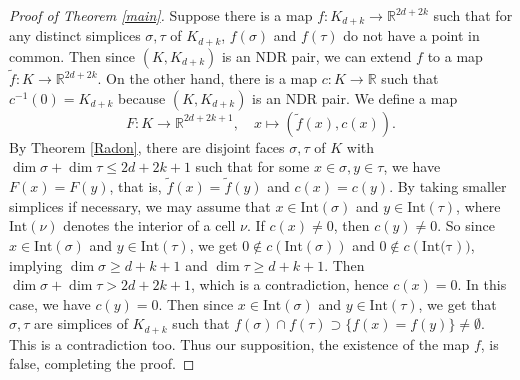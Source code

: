 \documentclass[amsfonts]{amsart}
\numberwithin{equation}{section}
\theoremstyle{definition}
\theoremstyle{remark}
\newcommand{\R}{\mathbb{R}}
\begin{document}
  \begin{proof}
    [Proof of Theorem \ref{main}]
    Suppose there is a map $f\colon K_{d+k}\to\R^{2d+2k}$ such that for any distinct simplices $\sigma,\tau$ of $K_{d+k}$, $f(\sigma)$ and $f(\tau)$ do not have a point in common. Then since $(K,K_{d+k})$ is an NDR pair, we can extend $f$ to a map $\tilde{f}\colon K\to\R^{2d+{2k}}$. On the other hand, there is a map $c\colon K\to\R$ such that $c^{-1}(0)=K_{d+k}$ because $(K,K_{d+k})$ is an NDR pair. We define a map
    \[
      F\colon K\to\R^{2d+2k+1},\quad x\mapsto(\tilde{f}(x),c(x)).
    \]
    By Theorem \ref{Radon}, there are disjoint faces $\sigma,\tau$ of $K$ with $\dim\sigma+\dim\tau\le 2d+2k+1$ such that for some $x\in\sigma,y\in\tau$, we have $F(x)=F(y)$, that is, $\tilde{f}(x)=\tilde{f}(y)$ and $c(x)=c(y)$. By taking smaller simplices if necessary, we may assume that $x\in\mathrm{Int}(\sigma)$ and $y\in\mathrm{Int}(\tau)$, where $\mathrm{Int}(\nu)$ denotes the interior of a cell $\nu$. If $c(x)\ne 0$, then $c(y)\ne 0$. So since $x\in \mathrm{Int}(\sigma)$ and $y\in\mathrm{Int}(\tau)$, we get $0\notin c(\mathrm{Int}(\sigma))$ and $0\notin c(\mathrm{Int(\tau}))$, implying $\dim\sigma\ge d+k+1$ and $\dim\tau\ge d+k+1$. Then $\dim\sigma+\dim\tau>2d+2k+1$, which is a contradiction, hence $c(x)=0$. In this case, we have $c(y)=0$. Then since $x\in\mathrm{Int}(\sigma)$ and $y\in\mathrm{Int}(\tau)$,  we get that $\sigma,\tau$ are simplices of $K_{d+k}$ such that $f(\sigma)\cap f(\tau)\supset\{f(x)=f(y)\}\ne\emptyset$. This is a contradiction too. Thus our supposition, the existence of the map $f$, is false, completing the proof.
  \end{proof}
\end{document}
